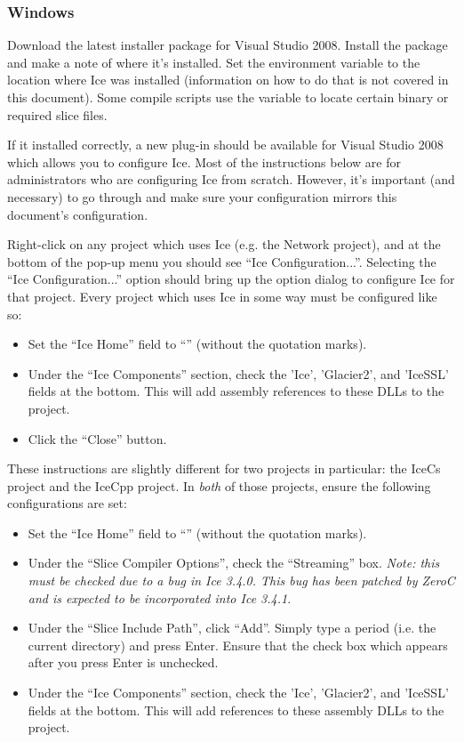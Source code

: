 \subsubsection*{Windows}

Download the latest installer package for Visual Studio 2008. Install the package and make a note of where it's installed. Set the environment variable  to the location where Ice was installed (information on how to do that is not covered in this document). Some compile scripts use the  variable to locate certain binary or required slice files.

If it installed correctly, a new plug-in should be available for Visual Studio 2008 which allows you to configure Ice. Most of the instructions below are for administrators who are configuring Ice from scratch. However, it's important (and necessary) to go through and make sure your configuration mirrors this document's configuration.

Right-click on any project which uses Ice (e.g. the Network project), and at the bottom of the pop-up menu you should see ``Ice Configuration...''. Selecting the ``Ice Configuration...'' option should bring up the option dialog to configure Ice for that project. Every project which uses Ice in some way must be configured like so:

\begin{itemize}
  \item Set the ``Ice Home'' field to ``'' (without the quotation marks).
  \item Under the ``Ice Components'' section, check the 'Ice', 'Glacier2', and 'IceSSL' fields at the bottom. This will add assembly references to these DLLs to the project.
  \item Click the ``Close'' button.
\end{itemize}

These instructions are slightly different for two projects in particular: the IceCs project and the IceCpp project. In \emph{both} of those projects, ensure the following configurations are set:

\begin{itemize}
	\item Set the ``Ice Home'' field to ``'' (without the quotation marks).
	\item Under the ``Slice Compiler Options'', check the ``Streaming'' box. \emph{Note: this must be checked due to a bug in Ice 3.4.0. This bug has been patched by ZeroC and is expected to be incorporated into Ice 3.4.1}.
	\item Under the ``Slice Include Path'', click ``Add''. Simply type a period (i.e. the current directory) and press Enter. Ensure that the check box which appears after you press Enter is unchecked.
	\item Under the ``Ice Components'' section, check the 'Ice', 'Glacier2', and 'IceSSL' fields at the bottom. This will add references to these assembly DLLs to the project.
\end{itemize}

